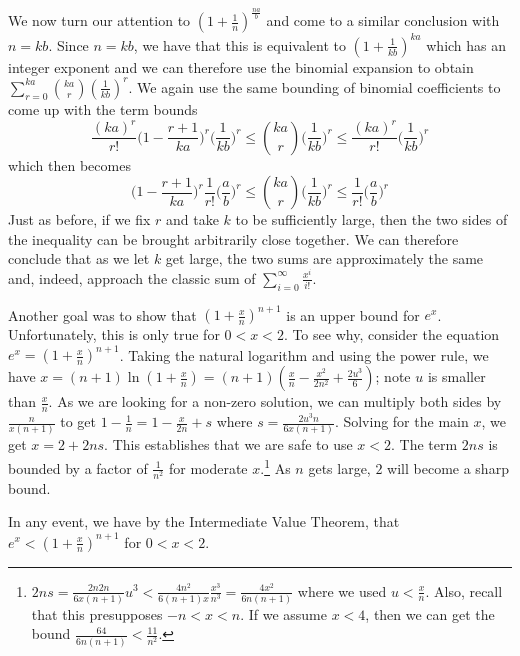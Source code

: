\documentclass[12pt]{article}
\begin{document}
We now turn our attention to $(1+\frac{1}{n})^{\frac{na}{b}}$ and come to a similar conclusion with $n= kb$. Since $n=kb$, we have  that this is equivalent to $(1+\frac{1}{kb})^{ka}$ which has an integer exponent and we can therefore use the binomial expansion to obtain $\sum_{r=0}^{ka} \binom{ka}{r} (\frac{1}{kb})^r$. We again use the same bounding of binomial coefficients to come up with the term bounds
$$\frac{(ka)^r}{r!} \bigg( 1 - \frac{r+1}{ka}\bigg)^r \bigg(\frac{1}{kb}\bigg)^r \leq \binom{ka}{r} \bigg(\frac{1}{kb}\bigg)^r \leq \frac{(ka)^r}{r!} \bigg(\frac{1}{kb}\bigg)^r$$ 
which then becomes
$$\bigg( 1 - \frac{r+1}{ka}\bigg)^r \frac{1}{r!} \bigg(\frac{a}{b}\bigg)^r \leq \binom{ka}{r} \bigg(\frac{1}{kb}\bigg)^r \leq \frac{1}{r!}\bigg(\frac{a}{b}\bigg)^r $$
Just as before, if we fix $r$ and take $k$ to be sufficiently large, then the two sides of the inequality can be brought arbitrarily close together. 
We can therefore conclude that as we let $k$ get large, the two sums are approximately the same and, indeed, approach the classic sum of $\sum_{i=0}^\infty \frac{x^i}{i!}$. 

Another goal was to show that $(1 + \frac{x}{n})^{n+1}$ is an upper bound for $e^x$. Unfortunately, this is only true for $0 < x < 2$. To see why, consider the equation $e^x = (1+\frac{x}{n})^{n+1}$. Taking the natural logarithm and using the power rule, we have $x = (n+1) \ln (1 + \frac{x}{n} ) = (n+1) (\frac{x}{n} - \frac{x^2}{2n^2} + \frac{2u^3}{6})$; note $u$ is smaller than $\frac{x}{n}$. As we are looking for a non-zero solution, we can multiply both sides by $\frac{n}{x (n+1)}$ to get $1- \frac{1}{n} = 1 - \frac{x}{2n} + s$ where $s = \frac{2u^3 n}{6 x (n+1)}$. Solving for the main $x$, we get $x = 2 + 2n s$. This establishes that we are safe to use $x < 2$. The term $2n s$ is bounded by a factor of $\frac{1}{n^2}$ for moderate $x$.\footnote{$2ns = \frac{2n2n}{6x(n+1)} u^3 < \frac{4n^2}{6(n+1)x} \frac{x^3}{n^3} = \frac{4x^2}{6n(n+1)}$ where we used $u <\frac{x}{n}$. Also, recall that this presupposes $-n < x < n$. If we assume $x < 4$, then we can get the bound $\frac{64}{6n(n+1)} < \frac{11}{n^2}$. } As $n$ gets large, $2$ will become a sharp bound. 

In any event, we have by the Intermediate Value Theorem, that $e^x < (1+\frac{x}{n})^{n+1}$ for $0 < x< 2$. 
\end{document}
